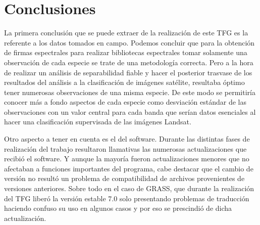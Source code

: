 


\chapter{Conclusiones}

La primera conclusión que se puede extraer de la realización de este \ac{TFG} es la referente a los datos tomados en campo. Podemos concluir que para la obtención de firmas espectrales para realizar bibliotecas espectrales tomar solamente una observación de cada especie se trate de una metodología correcta. Pero a la hora de realizar un análisis de separabilidad fiable y hacer el posterior trasvase de los resultados del análisis a la clasificación de imágenes satélite, resultaba óptimo tener numerosas observaciones de una misma especie. De este modo se permitiría conocer más a fondo aspectos de cada especie como desviación estándar de las observaciones con un valor central para cada banda que serían datos esenciales al hacer una clasificación supervisada de las imágenes Landsat.\Sep

Otro aspecto a tener en cuenta es el del software. Durante las distintas fases de realización del trabajo resultaron llamativas las numerosas actualizaciones que recibió el software. Y aunque la mayoría fueron actualizaciones menores que no afectaban a funciones importantes del programa, cabe destacar que el cambio de versión no resultó un problema de compatibilidad de archivos provenientes de versiones anteriores. Sobre todo en el caso de GRASS, que durante la realización del \ac{TFG} liberó la versión estable 7.0 solo presentando problemas de traducción haciendo confuso su uso en algunos casos y por eso se prescindió de dicha actualización.\Sep
